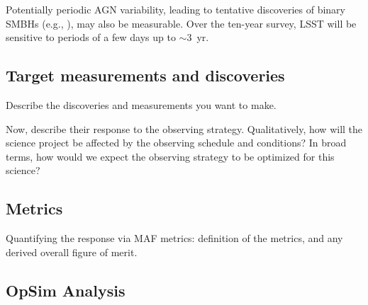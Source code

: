 Potentially periodic AGN variability, leading to tentative discoveries
of binary SMBHs (e.g., \citet{GrahamEtal2015}), may also be
measurable.  Over the ten-year survey, LSST will be sensitive to
periods of a few days up to $\sim3$~yr.




\subsection{Target measurements and discoveries}
\label{sec:\secname:targets}

Describe the discoveries and measurements you want to make.

Now, describe their response to the observing strategy. Qualitatively,
how will the science project be affected by the observing schedule and
conditions? In broad terms, how would we expect the observing strategy
to be optimized for this science?



\subsection{Metrics}
\label{sec:\secname:metrics}

Quantifying the response via MAF metrics: definition of the metrics,
and any derived overall figure of merit.





\subsection{OpSim Analysis}
\label{sec:\secname:analysis}

